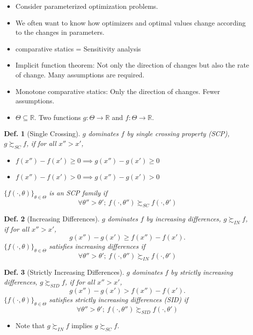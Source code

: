 \documentclass[11pt,a4paper,dvipdfmx]{article}
\theoremstyle{plain}
\newtheorem{df}{Def.}[section]
\newcommand{\R}{\mathbb{R}}
\newcommand{\1}{\mathbbm{1}}
\begin{document}
\begin{itemize}
	\item Consider parameterized optimization problems.
	\item We often want to know how optimizers and optimal values change according to the changes in parameters.
	\item comparative statics = Sensitivity analysis
	\item Implicit function theorem: Not only the direction of changes but also the rate of change. Many assumptions are required.
	\item Monotone comparative statics: Only the direction of changes. Fewer assumptions.
	\item $\Theta \subseteq \R$. Two functions $g: \Theta \to \R$ and $f: \Theta \to \R$.
\end{itemize}

\begin{df}[Single Crossing]
	$g$ dominates $f$ by single crossing property (SCP), $g \succsim_{SC} f$, if for all $x'' > x'$,
	\begin{itemize}
		\item $f(x'') - f(x') \geq 0 \implies g(x'') - g(x') \geq 0$
		\item $f(x'') - f(x') > 0 \implies g(x'') - g(x') > 0$
	\end{itemize}
	
	$\{f(\cdot, \theta)\}_{\theta \in \Theta}$ is an SCP family if
	$$
	\forall \theta'' > \theta' ; \ f(\cdot, \theta'') \succsim_{SC} f(\cdot, \theta')
	$$
\end{df}

\begin{df}[Increasing Differences]
	$g$ dominates $f$ by increasing differences, $g \succsim_{IN} f$, if for all $x'' > x'$, $$g(x'') - g(x') \geq f(x'') - f(x').$$
	$\{f(\cdot, \theta)\}_{\theta \in \Theta}$ satisfies increasing differences if
	$$
	\forall \theta'' > \theta' ; \ f(\cdot, \theta'') \succsim_{IN} f(\cdot, \theta')
	$$
\end{df}
\begin{df}[Strictly Increasing Differences]
	$g$ dominates $f$ by strictly increasing differences, $g \succsim_{SID} f$, if for all $x'' > x'$, $$g(x'') - g(x') > f(x'') - f(x').$$
	$\{f(\cdot, \theta)\}_{\theta \in \Theta}$ satisfies strictly increasing differences (SID) if
	$$
	\forall \theta'' > \theta' ; \ f(\cdot, \theta'') \succsim_{SID} f(\cdot, \theta')
	$$
\end{df}

\begin{itemize}
	\item Note that $g \succsim_{IN} f$ implies $g \succsim_{SC} f$.
\end{itemize}
\end{document}
